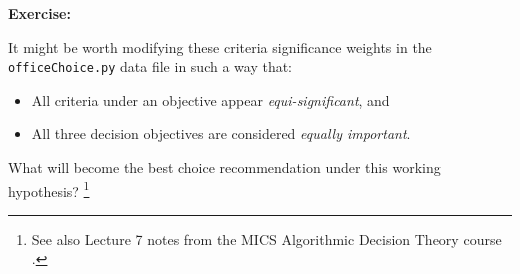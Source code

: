 \noindent \textbf{Exercise:}

\noindent It might be worth modifying these criteria significance weights in the \texttt{officeChoice.py} data file in such a way that:
\begin{itemize}
\item All criteria under an objective appear \emph{equi-significant}, and
\item All three decision objectives are considered \emph{equally important}.
\end{itemize}
What will become the best choice recommendation under this working hypothesis? \footnote{See also Lecture 7 notes from the MICS Algorithmic Decision Theory course \citep{ADT-L7}.} 


\clearpage


%
